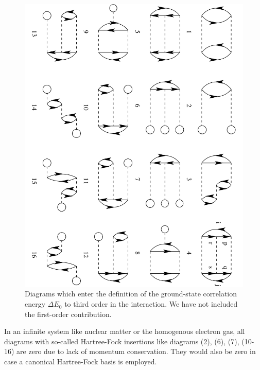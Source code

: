 \begin{figure}[hbtp]
    \includegraphics[width=\linewidth]{Chapter8-figures/mbpt.pdf}
      \caption{Diagrams which enter the definition of the ground-state
      correlation energy $\Delta E_0$ to third order in the interaction. We have not included the first-order contribution.}
      \label{fig:goldstone}
\end{figure}
In an infinite system like nuclear matter or the homogenous electron gas, all diagrams with so-called Hartree-Fock insertions like diagrams (2), (6), (7), (10-16) are zero 
due to lack of momentum conservation. They would also be zero in case a canonical \cite{shavittbartlett2009} Hartree-Fock basis is employed. 


